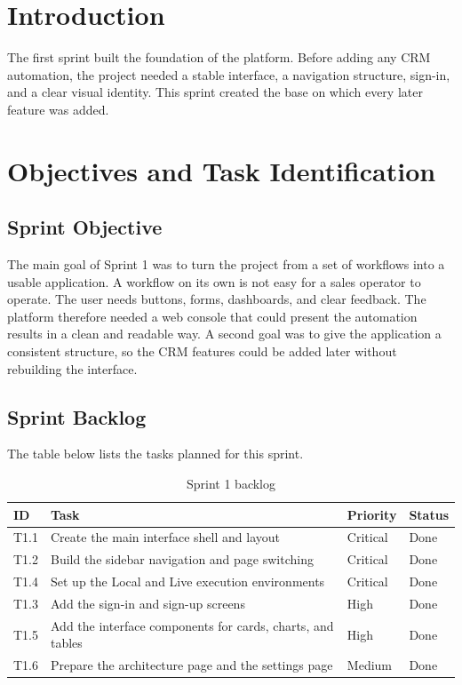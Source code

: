\documentclass[12pt,a4paper,oneside]{report}
\begin{document}
\section{Introduction}\label{sumlbl:c5s1}
The first sprint built the foundation of the platform. Before adding any CRM automation, the project needed a stable interface, a navigation structure, sign-in, and a clear visual identity. This sprint created the base on which every later feature was added.

\section{Objectives and Task Identification}\label{sumlbl:c5s2}
\subsection{Sprint Objective}\label{sumlbl:c5s2ss1}
The main goal of Sprint 1 was to turn the project from a set of workflows into a usable application. A workflow on its own is not easy for a sales operator to operate. The user needs buttons, forms, dashboards, and clear feedback. The platform therefore needed a web console that could present the automation results in a clean and readable way. A second goal was to give the application a consistent structure, so the CRM features could be added later without rebuilding the interface.

\subsection{Sprint Backlog}\label{sumlbl:c5s2ss2}
The table below lists the tasks planned for this sprint.

\begin{table}[H]
\centering
\small
\begin{tabularx}{\textwidth}{|p{1.4cm}|X|p{2cm}|p{2cm}|}
\hline\rowcolor{TabHead}
\textbf{ID} & \textbf{Task} & \textbf{Priority} & \textbf{Status} \\
\hline
T1.1 & Create the main interface shell and layout & Critical & Done \\
\hline
T1.2 & Build the sidebar navigation and page switching & Critical & Done \\
\hline
T1.4 & Set up the Local and Live execution environments & Critical & Done \\
\hline
T1.3 & Add the sign-in and sign-up screens & High & Done \\
\hline
T1.5 & Add the interface components for cards, charts, and tables & High & Done \\
\hline
T1.6 & Prepare the architecture page and the settings page & Medium & Done \\
\hline
\end{tabularx}
\caption{Sprint 1 backlog}
\end{table}
\end{document}
